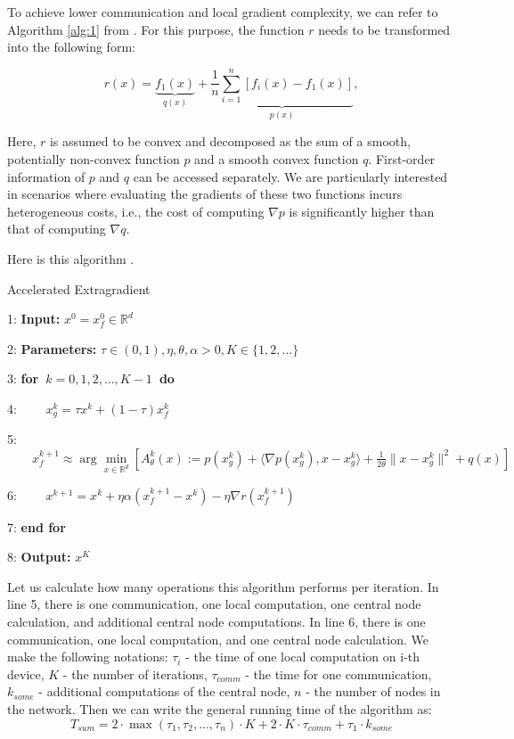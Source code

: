 \documentclass{article}
\begin{document}
To achieve lower communication and local gradient complexity, we can refer to Algorithm \ref{alg:1} from \cite{kovalev2022optimal}. For this purpose, the function $r$ needs to be transformed into the following form:

\begin{equation}
    \label{eq:2}
    r(x) = \underbrace{f_1(x)}_{q(x)} + \underbrace{\frac{1}{n}\sum\limits_{i = 1}^{n}[f_i(x) - f_1(x)]}_{p(x)},
\end{equation}

Here, $r$ is assumed to be convex and decomposed as the sum of a smooth, potentially non-convex function $p$ and a smooth convex function $q$. First-order information of $p$ and $q$ can be accessed separately. We are particularly interested in scenarios where evaluating the gradients of these two functions incurs heterogeneous costs, i.e., the cost of computing $\nabla p$ is significantly higher than that of computing $\nabla q$.

Here is this algorithm .

\begin{algorithm}
\caption{Accelerated Extragradient}\label{alg:1}
\begin{algorithmic}
\item [1:] \textbf{Input:} $x^0 = x_f^0\in\mathbb R^d$
\item [2:] \textbf{Parameters:} $\tau\in (0, 1), \eta, \theta, \alpha > 0, K\in \{1, 2, \ldots\}$
\item [3:] \textbf{for~}$k = 0, 1, 2, \ldots, K-1$\textbf{~do}
\item [4:]    $\quad\quad x_g^k = \tau x^k + (1 - \tau)x_f^k$
\item [5:]    $\quad\quad x_f^{k+1} \approx \arg\underset{x\in\mathbb R^d}{\min} [A_{\theta}^k (x) := p(x_g^k) + \langle \nabla p(x_g^k), x - x_g^k \rangle + \frac{1}{2\theta}\|x - x_g^k\|^2 + q(x)]$
\item [6:] $\quad\quad x^{k+1} = x^k + \eta\alpha(x_f^{k+1} - x^k) - \eta\nabla r(x_f^{k+1})$
\item [7:] \textbf{end for}
\item [8:] \textbf{Output:} $x^K$
\end{algorithmic}
\end{algorithm}

 Let us calculate how many operations this algorithm performs per iteration. In line 5, there is one communication, one local computation, one central node calculation, and additional central node computations. In line 6, there is one communication, one local computation, and one central node calculation. We make the following notations: $\tau_i$ - the time of one local computation on i-th device, $K$ - the number of iterations, $\tau_{comm}$ - the time for one communication, $k_{some}$ - additional computations of the central node, $n$ - the number of nodes in the network. Then we can write the general running time of the algorithm as:\\
\begin{equation}
    \label{eq:3}
    T_{sum} = 2\cdot\max(\tau_1, \tau_2, \ldots, \tau_n)\cdot K + 2\cdot K\cdot\tau_{comm} + \tau_1\cdot k_{some}
\end{equation}
\end{document}
